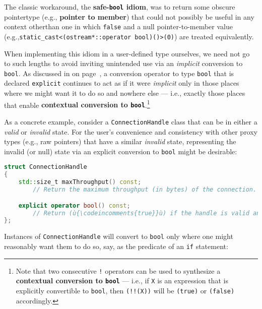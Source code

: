 \noindent The classic workaround, the \textbf{safe-\texttt{bool} idiom},
was to return some obscure pointer\linebreak[4] %
 type (e.g., \textbf{pointer to
member}) that could not possibly be useful in any context other\linebreak[4] %
 than one in which \texttt{false} and a null pointer-to-member value (e.g.,\linebreak[4] %
\texttt{static\_cast<(ostream*::operator}~\texttt{bool)()>(0)}) are
treated equivalently.

When implementing this idiom in a user-defined type ourselves, we need not go to such lengths to avoid inviting unintended use
via an \emph{implicit} conversion to \texttt{bool}. As discussed in \textit{} on page~\pageref{description-explicitconv}, a conversion operator to type
\texttt{bool} that is declared \texttt{explicit} continues to act as if
it were \emph{implicit} only in those places where we might want it to
do so and nowhere else --- i.e., exactly those places that enable
\textbf{contextual conversion to \texttt{bool}}.{\cprotect\footnote{Note that two
consecutive \texttt{!} operators can be used to synthesize a
\textbf{contextual conversion to \texttt{bool}} --- i.e., if \texttt{X} is an
expression that is explicitly convertible to \texttt{bool}, then
\texttt{(!!(X))} will be \texttt{(true)} or \texttt{(false)}
  accordingly.}}

As a concrete example, consider a \texttt{ConnectionHandle} class that
can be in either a \emph{valid} or \emph{invalid} state. For the user's
convenience and consistency with other proxy types (e.g., raw pointers)
that have a similar \emph{invalid} state, representing the invalid (or null) state via an explicit conversion to
\texttt{bool} might be desirable:

\begin{lstlisting}[language=C++]
struct ConnectionHandle
{
    std::size_t maxThroughput() const;
        // Return the maximum throughput (in bytes) of the connection.

    explicit operator bool() const;
        // Return (ù{\codeincomments{true}}ù) if the handle is valid and (ù{\codeincomments{false}}ù) otherwise.
};
\end{lstlisting}
    
\noindent Instances of \texttt{ConnectionHandle} will convert to \texttt{bool}
only where one might reasonably want them to do so, say, as the
predicate of an \texttt{if} statement:

